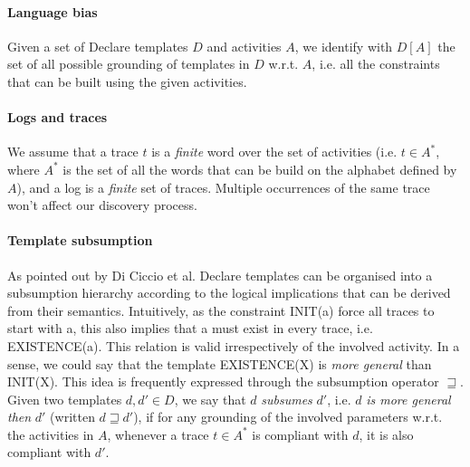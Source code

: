 \paragraph{Language bias} Given a set of Declare templates $D$ and activities $A$, we identify with $D[A]$ the set of all possible grounding of templates in $D$ w.r.t. $A$, i.e. all the constraints that can be built using the given activities.

\paragraph{Logs and traces} We assume that a trace $t$ is a \emph{finite} word over the set of activities (i.e. $t\in A^*$, where $A^*$ is the set of all the words that can be build on the alphabet defined by $A$), and a log is a \emph{finite} set of traces. Multiple occurrences of the same trace won't affect our discovery process. 

\paragraph{Template subsumption} As pointed out by Di Ciccio et al. \cite{2017-DiCiccio} Declare templates can be organised into a subsumption hierarchy according to the logical implications that can be derived from their semantics. Intuitively, as the constraint \textsf{INIT(a)} force all traces to start with \textsf{a}, this also implies that \textsf{a} must exist in every trace, i.e. \textsf{EXISTENCE(a)}. This relation is valid irrespectively of the involved activity. In a sense, we could say that the template \textsf{EXISTENCE(X)} is \emph{more general} than \textsf{INIT(X)}.
This idea is frequently expressed through the subsumption operator $\sqsupseteq$. Given two templates $d, d' \in D$, we say that $d$ \emph{subsumes} $d'$, i.e. $d$ \emph{is more general then} $d'$ (written $d\sqsupseteq d'$), if for any grounding of the involved parameters w.r.t. the activities in $A$, whenever a trace $t \in A^*$ is compliant with $d$, it is also compliant with $d'$.



